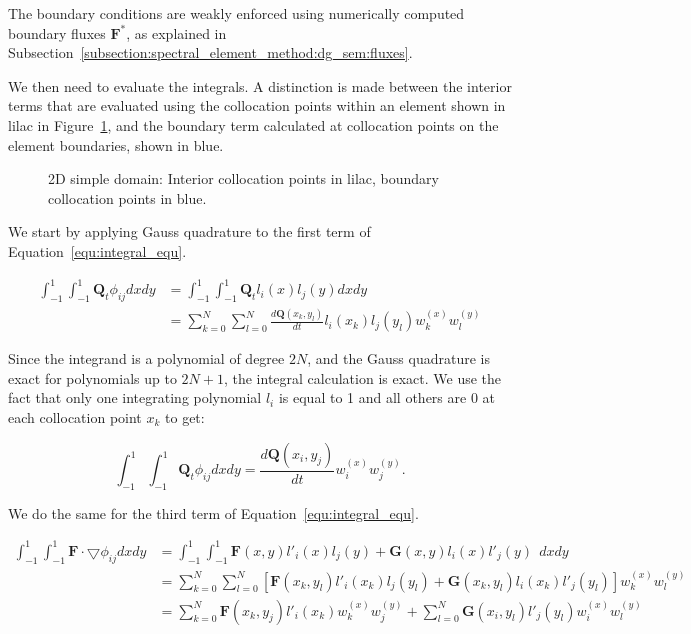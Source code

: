 \noindent
The boundary conditions are weakly enforced using numerically computed boundary fluxes
\(\mathbf{F}^*\), as explained in Subsection~\ref{subsection:spectral_element_method:dg_sem:fluxes}. 

We then need to evaluate the integrals. A distinction is made between the interior terms that are
evaluated using the collocation points within an element shown in lilac in
Figure~\ref{fig:domain_nodes}, and the boundary term calculated at collocation points on the element
boundaries, shown in blue.

\begin{figure}[H]
    \centering
    
    \caption{2D simple domain: Interior collocation points in lilac, boundary collocation points in blue.}\label{fig:domain_nodes}
\end{figure}

We start by applying Gauss quadrature to the first term of Equation~\ref{equ:integral_equ}.

\begin{equation}
    \begin{split}
        \int_{-1}^{1}\int_{-1}^{1} \mathbf{Q}_t \phi_{i j} dx dy 
        &= \int_{-1}^{1}\int_{-1}^{1}\mathbf{Q}_t l_i(x) l_j(y) dx dy \\
        &= \sum_{k = 0}^{N} \sum_{l = 0}^{N}\frac{d\mathbf{Q} \left( x_k, y_l \right)}{dt} l_i(x_k) l_j(y_l) w_k^{(x)} w_l^{(y)}
    \end{split}
\end{equation}

Since the integrand is a polynomial of degree \(2 N\), and the Gauss quadrature is exact for
polynomials up to \(2 N + 1\), the integral calculation is exact. We use the fact that only one
integrating polynomial \(l_i\) is equal to 1 and all others are 0 at each collocation point \(x_k\)
to get:

\begin{equation} \label{equ:integral_1}
    \int_{-1}^{1}\int_{-1}^{1} \mathbf{Q}_t \phi_{i j} dx dy 
    = \frac{d\mathbf{Q} \left( x_i, y_j \right)}{dt} w_i^{(x)} w_j^{(y)}.
\end{equation}

We do the same for the third term of Equation~\ref{equ:integral_equ}.

\begin{equation} \label{equ:integral_3}
    \begin{split}
        \int_{-1}^{1}\int_{-1}^{1}\mathbf{F} \cdot \bigtriangledown \phi_{i j} dx dy 
        &= \int_{-1}^{1}\int_{-1}^{1}\mathbf{F}(x, y) l'_i(x)l_j(y) + \mathbf{G}(x, y) l_i(x) l'_j(y) \: \: dx dy \\ 
        &= \sum_{k = 0}^{N} \sum_{l = 0}^{N}\left [ \mathbf{F}(x_k, y_l)l'_i(x_k)l_j(y_l) + \mathbf{G}(x_k, y_l) l_i(x_k)l'_j(y_l) \right ]w_k^{(x)} w_l^{(y)} \\
        &= \sum_{k = 0}^{N} \mathbf{F}(x_k, y_j)l'_i(x_k)w_k^{(x)} w_j^{(y)} + \sum_{l = 0}^{N}\mathbf{G}(x_i, y_l) l'_j(y_l) w_i^{(x)} w_l^{(y)}
    \end{split}
\end{equation}

